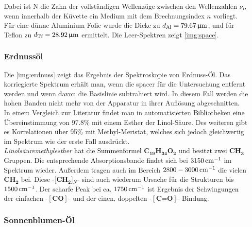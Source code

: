 \documentclass[a4paper,10pt,twocolumn]{article}
\newcommand{\ix}[1]{_\text{#1}}
\newcommand{\tilt}[1]{\textit{#1}}
\newcommand{\fett}[1]{\textbf{#1}}
\begin{document}
		Dabei ist N die Zahn der vollst\"andigen Wellenz\"uge zwischen den Wellenzahlen $\nu\ix{i}$, wenn innerhalb der K\"uvette ein Medium mit dem Brechnungsindex $n$ vorliegt. F\"ur eine d\"unne Aluminium-Folie wurde die Dicke zu $d\ix{Al}=\unit[79.67]{\upmu m}$, und f\"ur Teflon zu $d\ix{Tf}=\unit[28.92]{\upmu m}$ ermittelt. Die Leer-Spektren zeigt \autoref{img:space}.

		\subsubsection*{Erdnuss\"ol}

		Die \autoref{img:erdnuss} zeigt das Ergebnis der Spektroskopie von Erdnuss-\"Ol. Das korriegierte Spektrum erh\"alt man, wenn die spacer f\"ur die Untersuchung entfernt werden und wenn davon die Basislinie subtrahiert wird. In diesem Fall werden die hohen Banden nicht mehr von der Apparatur in ihrer Aufl\"osung abgeschnitten.\\
		In einem Vergleich zur Literatur findet man in automatisierten Bibliotheken eine \"Ubereinstimmung von 97.8\% mit einem Esther der Linol-S\"aure. Des weiteren gibt es Korrelationen \"uber 95\% mit Methyl-Meristat, welches sich jedoch gleichwertig im Spektrum wie der erste Fall ausdr\"uckt.\\
		\tilt{Linols\"auremethylesther} hat die Summenformel \fett{C}$_{\fett{19}}$\fett{H}$_{\fett{34}}$\fett{O}$_{\fett{2}}$ und besitzt zwei \fett{CH}$_{\fett{3}}$ Gruppen. Die entsprechende Absorptionsbande findet sich bei $\unit[3150]{cm^{-1}}$ im Spektrum wieder. Au{\ss}erdem tragen auch im Bereich $\unit[2800-3000]{cm^{-1}}$ die vielen \fett{CH}$_{\fett{2}}$ bei. Diese -[\fett{CH}$_{\fett{2}}$]$_{N}$- sind auch wiederum Ursache f\"ur die Strukturen bis $\unit[1500]{cm^{-1}}$. Der scharfe Peak bei ca. $\unit[1750]{cm^{-1}}$ ist Ergebnis der Schwingungen der einfachen -$[\fett{CO}]$- und der einen, doppelten -$[\fett{C=O}]$- Bindung.
		
		\subsubsection*{Sonnenblumen-\"Ol}
		
\end{document}
